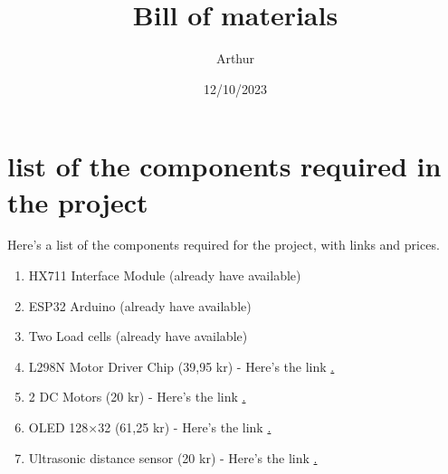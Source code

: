 \documentclass{article}
\title{Bill of materials}
\date{12/10/2023}
\author{Arthur}
\begin{document}
\maketitle
\section*{list of the components required in the project}
Here's a list of the components required for the project, with links and prices. 
\begin{enumerate}
    \item HX711 Interface Module (already have available)
    \item ESP32 Arduino (already have available)
    \item Two Load cells (already have available)
    \item L298N Motor Driver Chip (39,95 kr) - Here's the link \href{https://3deksperten.dk/products/stepper-motor-drive-controller-board-module-l298n-dual-h-bridge-dc-arduino-practical?variant=43306560127196&srsltid=AfmBOoqUu-d4Wxqn8hVqCp4xkQRwjZXgEqTseDREhLS8iNQyAo5-lExIFMM}.
    \item 2 DC Motors (20 kr) - Here's the link \href{https://ardustore.dk/produkt/dc-motor-3v-6v-8000rpm-micro}.
    \item OLED 128×32 (61,25 kr) - Here's the link \href{https://arduinotech.dk/shop/0-91-inch-oled-128x32-white-display-module-iic-i2c/}.
    \item Ultrasonic distance sensor (20 kr) - Here's the link \href{https://arduinotech.dk/shop/hc-sr04-afstands-maaler/}.
\end{enumerate}
\end{document}
